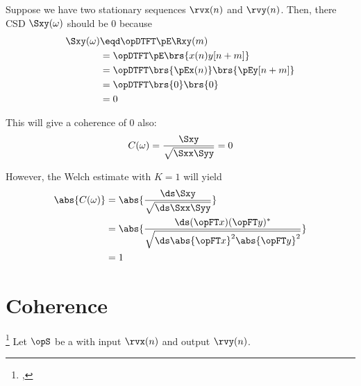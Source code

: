 \begin{example}[The K=1 Welch estimate of coherence]
Suppose we have two  stationary sequences $\rvx(n)$ and $\rvy(n)$. Then, there
CSD $\Sxy(\omega)$ should be $0$ because
\begin{align*}
  \Sxy(\omega)
    &\eqd \opDTFT\pE\Rxy(m)
  \\&=    \opDTFT\pE\brs{x(n)y[n+m]}
  \\&=    \opDTFT\brs{\pEx(n)} \brs{\pEy[n+m]}
  \\&=    \opDTFT\brs{0} \brs{0}
  \\&=    0
\end{align*}

This will give a coherence of $0$ also:
\[ C(\omega) = \frac{\Sxy}{\sqrt{\Sxx\Syy}} = 0\]

However, the Welch estimate with $K=1$ will yield
\begin{align*}
  \abs{C(\omega)}
    &= \abs{\frac{\ds\Sxy}{\sqrt{\ds\Sxx\Syy}}}
  \\&= \abs{\frac{\ds (\opFT x)(\opFT y)^\ast}{\sqrt{\ds\abs{\opFT x}^2\abs{\opFT y}^2}}}
  \\&= 1
\end{align*}

\end{example}



\section{Coherence}
\begin{definition}
\footnote{
  ,
  }
Let $\opS$ be a  with input $\rvx(n)$ and output $\rvy(n)$.
\end{definition}
